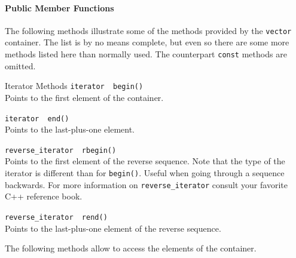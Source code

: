 \paragraph{Public Member Functions}
The following methods illustrate some of the methods provided by
the {\tt vector} container.  The list is by no means complete, but
even so there are some more methods listed here than normally used.
The counterpart {\tt const} methods are omitted.
\begin{Entry}
\item[Iterator Methods]
  \verb+iterator  begin()+\\
  Points to the first element of the container.

  \verb+iterator  end()+\\
  Points to the last-plus-one element.

  \verb+reverse_iterator  rbegin()+\\
  Points to the first element of the reverse sequence.
  Note that the
  type of the iterator is different than for {\tt begin()}.
  Useful when going through a sequence backwards.  For more
  information on {\tt reverse\_iterator} consult your favorite
  C++ reference book.
  
  \verb+reverse_iterator  rend()+\\
  Points to the last-plus-one element of the reverse sequence.

\end{Entry}

The following methods allow to access the elements of the container.

